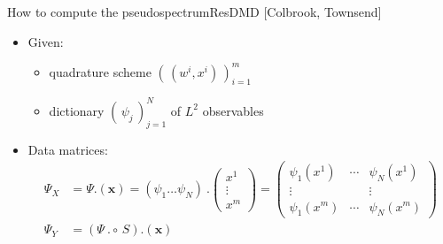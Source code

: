 \documentclass[
  english,            %
  aspectratio=169,    %
]{tumbeamer}
\begin{document}
\begin{frame}{How to compute the pseudospectrum}{ResDMD [Colbrook, Townsend]}
  
\begin{itemize}
  \item Given: 
  \begin{itemize}
    \item quadrature scheme $(\, (w^i, x^i) \,)_{i=1}^m$
    \item dictionary $(\, \psi_j \,)_{j=1}^N$ of $L^2$ observables
  \end{itemize}
  \item Data matrices: 
  \begin{align}
    \Psi_X &= \Psi . (\mathbf{x}) = (\psi_1 \ldots \psi_N)\ . 
    \begin{pmatrix}
      x^1 \\
      \vdots \\
      x^m
    \end{pmatrix}
    = \begin{pmatrix}
      \psi_1 (x^1) & \cdots & \psi_N (x^1) \\
      \vdots & & \vdots \\
      \psi_1 (x^m) & \cdots & \psi_N (x^m)
    \end{pmatrix} \\
    \Psi_Y &= (\Psi\ .\circ \,S) . (\mathbf{x})
  \end{align}
\end{itemize}

\end{frame}
\end{document}
